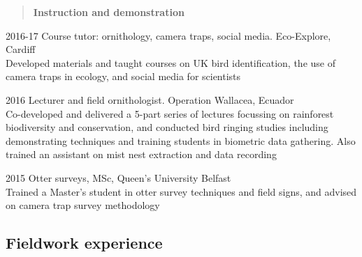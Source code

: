 \documentclass[]{article}
\begin{document}
\begin{quote}
\textbf{Instruction and demonstration}
\end{quote}

2016-17 Course tutor: ornithology, camera traps, social media.
Eco-Explore, Cardiff\\
Developed materials and taught courses on UK bird identification, the
use of camera traps in ecology, and social media for scientists

2016 Lecturer and field ornithologist. Operation Wallacea, Ecuador\\
Co-developed and delivered a 5-part series of lectures focussing on
rainforest biodiversity and conservation, and conducted bird ringing
studies including demonstrating techniques and training students in
biometric data gathering. Also trained an assistant on mist nest
extraction and data recording

2015 Otter surveys, MSc, Queen's University Belfast\\
Trained a Master's student in otter survey techniques and field signs,
and advised on camera trap survey methodology

\subsection{Fieldwork experience}\label{fieldwork-experience}
\end{document}
